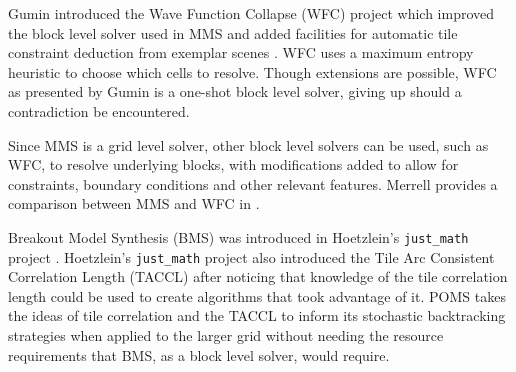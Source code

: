 
Gumin introduced the Wave Function Collapse (WFC) project which improved the block level solver used in MMS
and added facilities for automatic tile constraint deduction from exemplar scenes \cite{Gumin_2016}.
WFC uses a maximum entropy heuristic to choose which cells to resolve.
Though extensions are possible, WFC as presented by Gumin is a one-shot block level solver, giving up should a contradiction be encountered.

Since MMS is a grid level solver, other block level solvers can be used, such as WFC, to resolve underlying blocks,
with modifications added to allow for constraints, boundary conditions and other relevant features.
Merrell provides a comparison between MMS and WFC in \cite{Merrell_comparison_2021}.

Breakout Model Synthesis (BMS) was introduced in Hoetzlein's \texttt{just\_math} project \cite{Hoetzlein_2023}.
Hoetzlein's \texttt{just\_math} project also introduced
the Tile Arc Consistent Correlation Length (TACCL) after noticing that knowledge of the tile correlation length could be
used to create algorithms that took advantage of it.
POMS takes the ideas of tile correlation and the TACCL to inform its stochastic backtracking strategies when applied to the larger grid
without needing the resource requirements that BMS, as a block level solver, would require.

